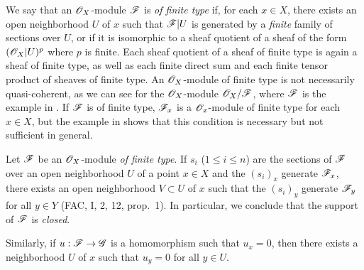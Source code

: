\begin{env}[5.2.1]
\label{0.5.2.1}
We say that an $\mathscr{O}_X$-module $\mathscr{F}$ is {\em of finite type} if, for each $x\in X$, there
exists an open neighborhood $U$ of $x$ such that $\mathscr{F}|U$ is generated by a {\em finite}
family of sections over $U$, or if it is isomorphic to a sheaf quotient of a sheaf of the
form $(\mathscr{O}_X|U)^p$ where $p$ is finite. Each sheaf quotient of a sheaf of finite type is
again a sheaf of finite type, as well as each finite direct sum and each finite tensor
product of sheaves of finite type. An $\mathscr{O}_X$-module of finite type is not necessarily
quasi-coherent, as we can see for the $\mathscr{O}_X$-module $\mathscr{O}_X/\mathscr{F}$, where $\mathscr{F}$ is the
example in . If $\mathscr{F}$ is of finite type, $\mathscr{F}_x$ is a $\mathscr{O}_x$-module
of finite type for each $x\in X$, but the example in  shows that this
condition is necessary but not sufficient in general.
\end{env}

\begin{env}[5.2.2]
\label{0.5.2.2}
Let $\mathscr{F}$ be an $\mathscr{O}_X$-module {\em of finite type}. If $s_i$ ($1\leqslant i\leqslant n$)
are the sections of $\mathscr{F}$ over an open neighborhood $U$ of a point $x\in X$ and the
$(s_i)_x$ generate $\mathscr{F}_x$, there exists an open neighborhood $V\subset U$ of $x$ such
that the $(s_i)_y$ generate $\mathscr{F}_y$ for all $y\in Y$ (FAC, I, 2, 12, prop.~1). In
particular, we conclude that the support of $\mathscr{F}$ is {\em closed}.

Similarly, if $u:\mathscr{F}\to\mathscr{G}$ is a homomorphism such that $u_x=0$, then there exists a
neighborhood $U$ of $x$ such that $u_y=0$ for all $y\in U$.
\end{env}

